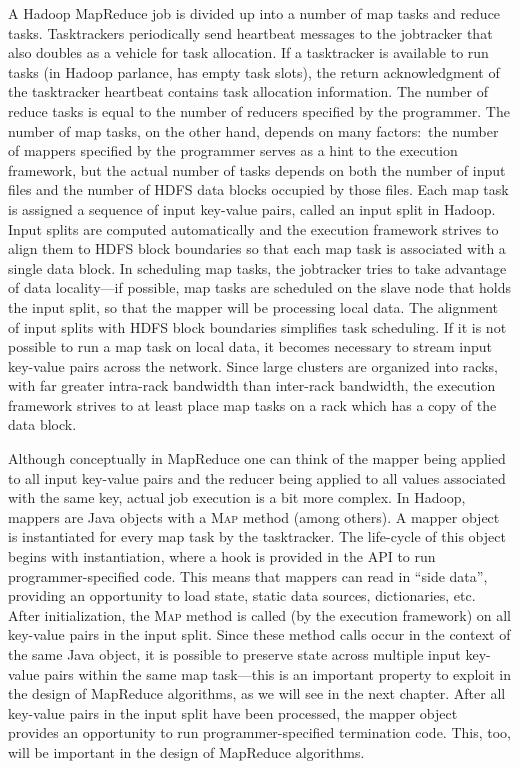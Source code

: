 A Hadoop MapReduce job is divided up into a number of map tasks and
reduce tasks.  Tasktrackers periodically send heartbeat messages to
the jobtracker that also doubles as a vehicle for task allocation.  If
a tasktracker is available to run tasks (in Hadoop parlance, has empty
task slots), the return acknowledgment of the tasktracker heartbeat
contains task allocation information.  The number of reduce tasks is
equal to the number of reducers specified by the programmer.  The
number of map tasks, on the other hand, depends on many factors:\ the
number of mappers specified by the programmer serves as a hint to the
execution framework, but the actual number of tasks depends on both
the number of input files and the number of HDFS data blocks occupied
by those files.  Each map task is assigned a sequence of input
key-value pairs, called an input split in Hadoop.  Input splits are
computed automatically and the execution framework strives to align
them to HDFS block boundaries so that each map task is associated with
a single data block.  In scheduling map tasks, the jobtracker tries to
take advantage of data locality---if possible, map tasks are scheduled
on the slave node that holds the input split, so that the mapper will
be processing local data.  The alignment of input splits with HDFS
block boundaries simplifies task scheduling.  If it is not possible to
run a map task on local data, it becomes necessary to stream input
key-value pairs across the network.  Since large clusters are
organized into racks, with far greater intra-rack bandwidth than
inter-rack bandwidth, the execution framework strives to at least
place map tasks on a rack which has a copy of the data block.

Although conceptually in MapReduce one can think of the mapper being
applied to all input key-value pairs and the reducer being applied to
all values associated with the same key, actual job execution is a bit
more complex.  In Hadoop, mappers are Java objects with a \textsc{Map}
method (among others).  A mapper object is instantiated for every map
task by the tasktracker.  The life-cycle of this object begins with
instantiation, where a hook is provided in the API to run
programmer-specified code.  This means that mappers can read in ``side
data'', providing an opportunity to load state, static data sources,
dictionaries, etc.  After initialization, the \textsc{Map} method is
called (by the execution framework) on all key-value pairs in the
input split.  Since these method calls occur in the context of the
same Java object, it is possible to preserve state across multiple
input key-value pairs within the same map task---this is an important
property to exploit in the design of MapReduce algorithms, as we will
see in the next chapter.  After all key-value pairs in the input split
have been processed, the mapper object provides an opportunity to run
programmer-specified termination code.  This, too, will be important
in the design of MapReduce algorithms.

